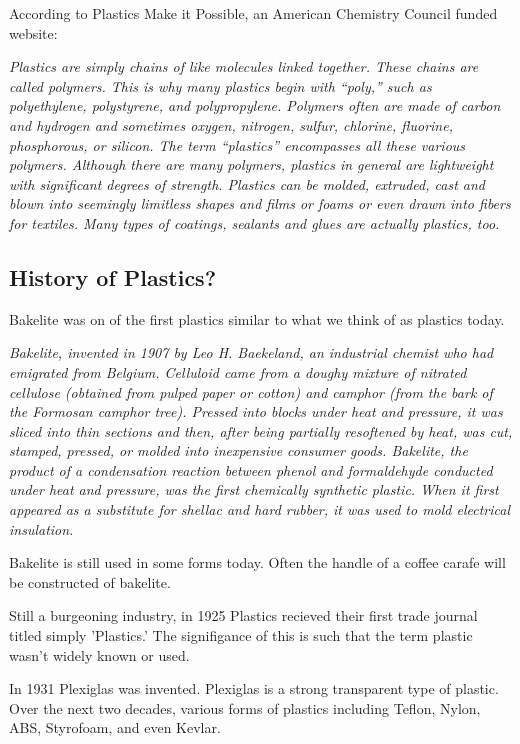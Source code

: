 \documentclass[paper=a4, fontsize=11pt]{article}
\begin{document}
According to Plastics Make it Possible, an American Chemistry Council funded website:

\textit{Plastics are simply chains of like molecules linked together. 
These chains are called polymers. This is why many plastics begin with “poly,” such as polyethylene, polystyrene, 
and polypropylene. Polymers often are made of carbon and hydrogen and sometimes oxygen, nitrogen, sulfur, 
chlorine, fluorine, phosphorous, or silicon.
The term “plastics” encompasses all these various polymers.
Although there are many polymers, plastics in general are lightweight with significant degrees of strength. 
Plastics can be molded, extruded, cast and blown into seemingly limitless  shapes and films or foams or even drawn into fibers for textiles. 
Many types of coatings, sealants and glues are actually plastics, too.}  \cite{what_plastics}

\subsection{History of Plastics?}

Bakelite was on of the first plastics similar to what we think of as plastics today.

\textit{ Bakelite, invented in 1907 by Leo H. Baekeland, an industrial chemist who had emigrated from Belgium. Celluloid came from a 
doughy mixture of nitrated cellulose (obtained from pulped paper or cotton) and camphor (from the bark of the Formosan camphor tree). 
Pressed into blocks under heat and pressure, it was sliced into thin sections and then, after being partially resoftened by heat, was cut, stamped, pressed, 
or molded into inexpensive consumer goods. Bakelite, the product of a condensation reaction between phenol and formaldehyde conducted under heat and pressure, 
was the first chemically synthetic plastic. When it first appeared as a substitute for shellac and hard rubber, it was used to mold electrical insulation.} \cite{hist_plastics}

Bakelite is still used in some forms today. Often the handle of a coffee carafe will be constructed of bakelite. 

Still a burgeoning industry, in 1925 Plastics recieved their first trade journal titled simply 'Plastics.' The signifigance of this is such that the term plastic wasn't widely
known or used.

In 1931 Plexiglas was invented. Plexiglas is a strong transparent type of plastic. Over the next two decades, various forms of plastics including Teflon, Nylon, ABS, Styrofoam, and even Kevlar.
\end{document}
